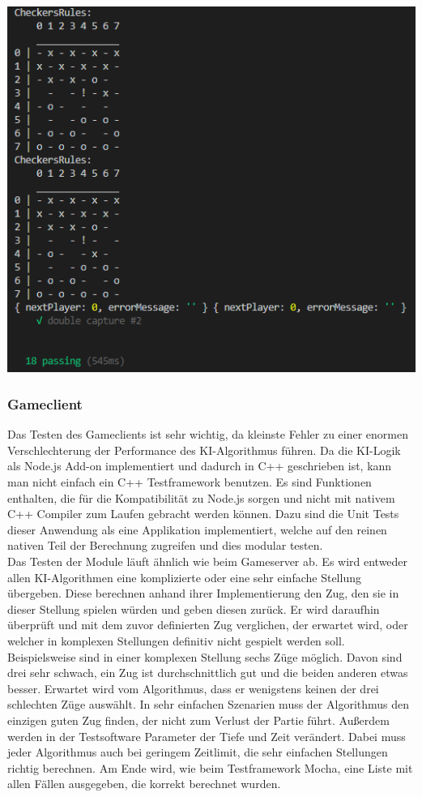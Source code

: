 \documentclass[12pt,a4paper,bibliography=totocnumbered,listof=totocnumbered]{article}
\begin{document}
\vspace{1em}
\begin{minipage}{\linewidth}
	\centering
	\includegraphics[width=0.6\linewidth]{pics/UnitTestResult.png}
	\label{fig:UnitTestResult}
\end{minipage}

\subsubsection{Gameclient}
Das Testen des Gameclients ist sehr wichtig, da kleinste Fehler zu einer enormen Verschlechterung der Performance des \ac{KI}-Algorithmus führen.
Da die \ac{KI}-Logik als Node.js Add-on implementiert und dadurch in C++ geschrieben ist, kann man nicht einfach ein C++ Testframework benutzen. 
Es sind Funktionen enthalten, die für die Kompatibilität zu Node.js sorgen und nicht mit nativem C++ Compiler zum Laufen gebracht werden können.
Dazu sind die Unit Tests dieser Anwendung als eine Applikation implementiert, welche auf den reinen nativen Teil der Berechnung zugreifen und 
dies modular testen. 
\\
Das Testen der Module läuft ähnlich wie beim Gameserver ab. Es wird entweder allen \ac{KI}-Algorithmen eine komplizierte oder eine sehr einfache Stellung 
übergeben. Diese berechnen anhand ihrer Implementierung den Zug, den sie in dieser Stellung spielen würden und
geben diesen zurück. Er wird daraufhin überprüft und mit dem zuvor definierten Zug verglichen, der erwartet wird, oder welcher in 
komplexen Stellungen definitiv nicht gespielt werden soll. Beispielsweise sind in einer komplexen Stellung sechs Züge möglich. Davon sind drei sehr schwach,
ein Zug ist durchschnittlich gut und die beiden anderen etwas besser. Erwartet wird vom Algorithmus, dass er wenigstens keinen der drei schlechten Züge
auswählt. In sehr einfachen Szenarien muss der Algorithmus den einzigen guten Zug finden, der nicht zum Verlust der Partie führt. 
Außerdem werden in der Testsoftware Parameter der Tiefe und Zeit verändert. Dabei muss jeder Algorithmus auch bei geringem Zeitlimit, die sehr einfachen
Stellungen richtig berechnen. Am Ende wird, wie beim Testframework Mocha, eine Liste mit allen Fällen ausgegeben, die korrekt berechnet wurden.
\end{document}
